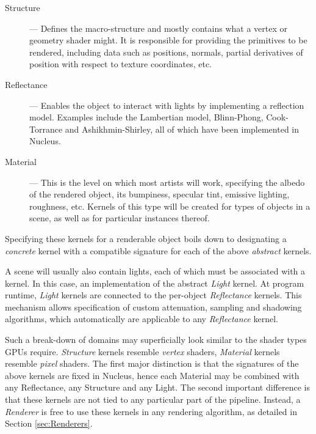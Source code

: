 \begin{description}
\item[Structure] --- Defines the macro-structure and mostly contains what a vertex or geometry shader might. It is responsible for providing the primitives to be rendered, including data such as positions, normals, partial derivatives of position with respect to texture coordinates, etc.

\item[Reflectance] --- Enables the object to interact with lights by implementing a reflection model. Examples include the Lambertian model, Blinn-Phong, Cook-Torrance and Ashikhmin-Shirley, all of which have been implemented in Nucleus.

\item[Material] --- This is the level on which most artists will work, specifying the albedo of the rendered object, its bumpiness, specular tint, emissive lighting, roughness, etc. Kernels of this type will be created for types of objects in a scene, as well as for particular instances thereof.
\end{description}

Specifying these kernels for a renderable object boils down to designating a \emph{concrete} kernel with a compatible signature for each of the above \emph{abstract} kernels.

A scene will usually also contain lights, each of which must be associated with a kernel. In this case, an implementation of the abstract \emph{Light} kernel. At program runtime, \emph{Light} kernels are connected to the per-object \emph{Reflectance} kernels. This mechanism allows specification of custom attenuation, sampling and shadowing algorithms, which automatically are applicable to any \emph{Reflectance} kernel.


Such a break-down of domains may superficially look similar to the shader types GPUs require. \emph{Structure} kernels resemble \emph{vertex} shaders, \emph{Material} kernels resemble \emph{pixel} shaders. The first major distinction is that the signatures of the above kernels are fixed in Nucleus, hence each Material may be combined with any Reflectance, any Structure and any Light. The second important difference is that these kernels are not tied to any particular part of the pipeline. Instead, a \emph{Renderer} is free to use these kernels in any rendering algorithm, as detailed in Section \ref{sec:Renderers}.

